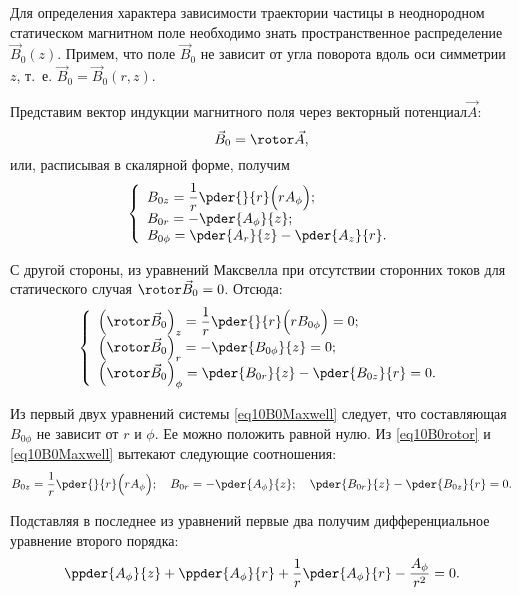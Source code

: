 
Для определения характера зависимости траектории частицы в неоднородном
статическом магнитном поле необходимо знать пространственное распределение
\( \vec{B}_0(z) \). Примем, что поле \( \vec{B}_0 \) не зависит от угла поворота
вдоль оси симметрии \( z \), т.~е. \( \vec{B}_0 = \vec{B}_0(r, z) \).

Представим вектор индукции магнитного поля через векторный потенциал\( \vec{A} \):
\[
  \vec{B}_0 = \rotor\vec{A},
\]
или, расписывая в скалярной форме, получим
\begin{equation}
  \left\{
    \begin{array}{l}
      \displaystyle B_{0z} = \frac{1}{r}\pder{}{r} \Big( rA_\phi \Big); \\
      \displaystyle B_{0r} = -\pder{A_\phi}{z}; \\
      \displaystyle B_{0\phi} = \pder{A_r}{z} - \pder{A_z}{r}.
    \end{array}
  \right.
  \label{eq10B0rotor}
\end{equation}

С другой стороны, из уравнений Максвелла при отсутствии сторонних токов для
статического случая \( \rotor\vec{B}_0 = 0 \). Отсюда:
\begin{equation}
  \left\{
    \begin{array}{l}
      \displaystyle \Big( \rotor\vec{B}_0 \Big)_z = \frac{1}{r} \pder{}{r}
        \Big( rB_{0\phi} \Big) = 0; \\
      \displaystyle \Big( \rotor\vec{B}_0 \Big)_r = -\pder{B_{0\phi}}{z} = 0; \\
      \displaystyle \Big( \rotor\vec{B}_0 \Big)_\phi = \pder{B_{0r}}{z} -
        \pder{B_{0z}}{r} = 0.
    \end{array}
  \right.
  \label{eq10B0Maxwell}
\end{equation}

Из первый двух уравнений системы \eqref{eq10B0Maxwell} следует, что составляющая
\( B_{0\phi} \) не зависит от \( r \) и \( \phi \). Ее можно положить равной
нулю. Из \eqref{eq10B0rotor} и \eqref{eq10B0Maxwell} вытекают следующие
соотношения:
\begin{equation}
  B_{0z} = \frac{1}{r} \pder{}{r} \Big( rA_\phi \Big); \quad
    B_{0r} = -\pder{A_\phi}{z}; \quad
    \pder{B_{0r}}{z} - \pder{B_{0z}}{r} = 0.
  \label{eq10B0z}
\end{equation}

Подставляя в последнее из уравнений первые два получим дифференциальное
уравнение второго порядка:
\[
  \ppder{A_\phi}{z} + \ppder{A_\phi}{r} + \frac{1}{r}\pder{A_\phi}{r} -
    \frac{A_\phi}{r^2} = 0.
\]

